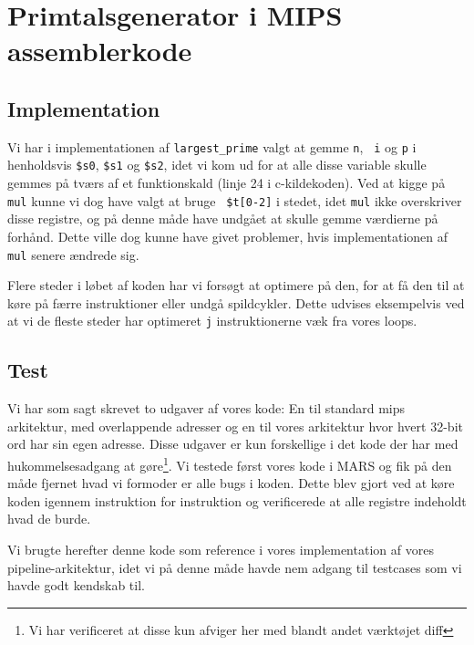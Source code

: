 \section{Primtalsgenerator i MIPS assemblerkode}
\subsection{Implementation}
Vi har i implementationen af {\tt largest\_prime} valgt at gemme {\tt n}, {\tt
i} og {\tt p} i henholdsvis {\tt \$s0}, {\tt \$s1} og {\tt \$s2}, idet vi kom ud
for at alle disse variable skulle gemmes på tværs af et funktionskald (linje 24
i c-kildekoden). Ved at kigge på {\tt mul} kunne vi dog have valgt at bruge {\tt
\$t[0-2]} i stedet, idet {\tt mul} ikke overskriver disse registre, og på denne
måde have undgået at skulle gemme værdierne på forhånd. Dette ville dog kunne
have givet problemer, hvis implementationen af {\tt mul} senere ændrede sig.

Flere steder i løbet af koden har vi forsøgt at optimere på den, for at få den
til at køre på færre instruktioner eller undgå spildcykler. Dette udvises eksempelvis
ved at vi de fleste steder har optimeret {\tt j} instruktionerne væk fra vores
loops.

\subsection{Test}
Vi har som sagt skrevet to udgaver af vores kode: En til standard mips
arkitektur, med overlappende adresser og en til vores arkitektur hvor hvert
32-bit ord har sin egen adresse. Disse udgaver er kun forskellige i det kode der
har med hukommelsesadgang at gøre\footnote{Vi har verificeret at disse kun
afviger her med blandt andet værktøjet diff}. Vi testede først vores kode i MARS
og fik på den måde fjernet hvad vi formoder er alle bugs i koden. Dette blev
gjort ved at køre koden igennem instruktion for instruktion og verificerede at
alle registre indeholdt hvad de burde.

Vi brugte herefter denne kode som reference i vores implementation af vores
pipeline-arkitektur, idet vi på denne måde havde nem adgang til testcases som vi
havde godt kendskab til.
